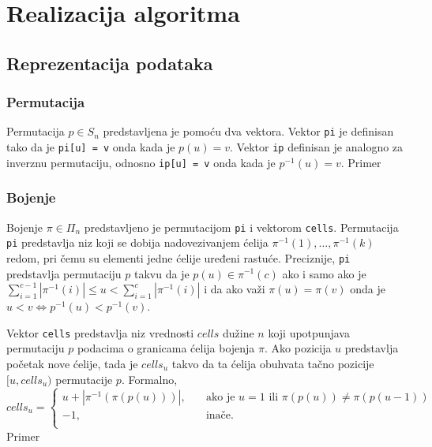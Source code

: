 \documentclass[12pt,oneside]{memoir}
\theoremstyle{definition}
\begin{document}
\chapter{Realizacija algoritma}

 \section{Reprezentacija podataka}

  \subsection{Permutacija}

   Permutacija $p \in S_n$ predstavljena je pomoću dva vektora. Vektor
   \texttt{pi} je definisan tako da je \texttt{pi[u] = v} onda kada je $p(u) =
   v$. Vektor \texttt{ip} definisan je analogno za inverznu permutaciju,
   odnosno \texttt{ip[u] = v} onda kada je $p^{-1}(u) = v$. {\color{red}Primer}

  \subsection{Bojenje}

   Bojenje $\pi \in \Pi_n$ predstavljeno je permutacijom \texttt{pi} i vektorom
   \texttt{cells}. Permutacija \texttt{pi} predstavlja niz koji se dobija
   nadovezivanjem ćelija $\pi^{-1}(1), \dots, \pi^{-1}(k)$ redom, pri čemu su
   elementi jedne ćelije uređeni rastuće. Preciznije, \texttt{pi} predstavlja
   permutaciju $p$ takvu da je $p(u) \in \pi^{-1}(c)$ ako i samo ako je
   $\sum_{i = 1}^{c-1} |\pi^{-1}(i)| \leq u < \sum_{i = 1}^c |\pi^{-1}(i)|$ i
   da ako važi $\pi(u) = \pi(v)$ onda je $u < v \iff p^{-1}(u) < p^{-1}(v)$.

   Vektor \texttt{cells} predstavlja niz vrednosti $cells$ dužine $n$ koji
   upotpunjava permutaciju $p$ podacima o granicama ćelija bojenja $\pi$. Ako
   pozicija $u$ predstavlja početak nove ćelije, tada je $cells_u$ takvo da ta
   ćelija obuhvata tačno pozicije $[u, cells_u)$ permutacije $p$.  Formalno,
   $$ cells_u =
     \begin{cases}
		 u + |\pi^{-1}(\pi(p(u)))|, & \quad \text{ako je } u = 1 \text{ ili }
		 \pi(p(u)) \neq \pi(p(u-1)) \\
		 -1, & \quad \text{inače.} \\
	 \end{cases}
   $$
   {\color{red}Primer}
\end{document}
